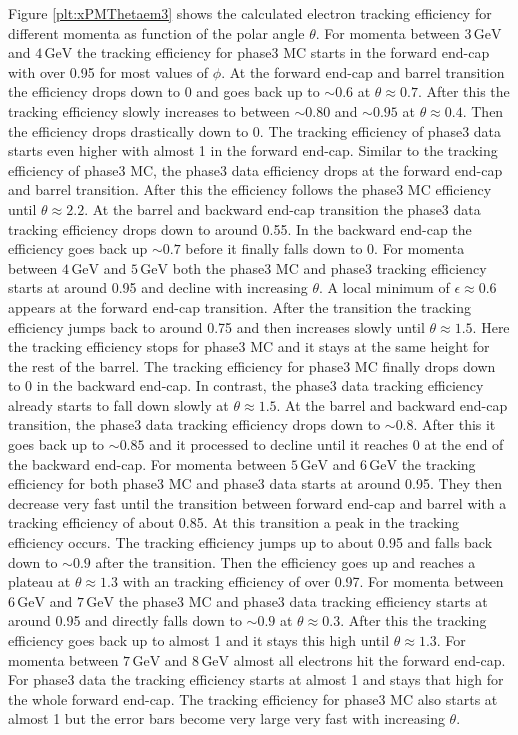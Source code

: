 \documentclass[a4paper,11pt,twosided,final,german,openbib,pdftex,listof=totoc,bibliography=totoc]{scrbook}
\begin{document}
Figure \ref{plt:xPMThetaem3} shows the calculated electron tracking efficiency for different momenta as function of the polar angle $\theta$.
For momenta between $3\,\textrm{GeV}$ and $4\,\textrm{GeV}$ the tracking efficiency for phase3 MC starts in the forward end-cap with over 0.95 for most values of $\phi$. At the forward end-cap and barrel transition the efficiency drops down to 0 and goes back up to $\sim 0.6$ at $\theta \approx 0.7$. After this the tracking efficiency slowly increases to between $\sim 0.80$ and $\sim 0.95$ at $\theta \approx 0.4$. Then the efficiency drops drastically down to 0. The tracking efficiency of phase3 data starts even higher with almost 1 in the forward end-cap. Similar to the tracking efficiency of phase3 MC, the phase3 data efficiency drops at the forward end-cap and barrel transition. After this the efficiency follows the phase3 MC efficiency until $\theta \approx 2.2$. At the barrel and backward end-cap transition the phase3 data tracking efficiency drops down to around 0.55. In the backward end-cap the efficiency goes back up $\sim 0.7$ before it finally falls down to 0.
For momenta between $4\,\textrm{GeV}$ and $5\,\textrm{GeV}$ both the phase3 MC and phase3 tracking efficiency starts at around 0.95 and decline with increasing $\theta$. A local minimum of $\epsilon \approx 0.6$ appears at the forward end-cap transition. After the transition the tracking efficiency jumps back to around 0.75 and then increases slowly until $\theta \approx 1.5$. Here the tracking efficiency stops for phase3 MC and it stays at the same height for the rest of the barrel. The tracking efficiency for phase3 MC finally drops down to 0 in the backward end-cap. In contrast, the phase3 data tracking efficiency already starts to fall down slowly at $\theta \approx 1.5$. At the barrel and backward end-cap transition, the phase3 data tracking efficiency drops down to $\sim 0.8$. After this it goes back up to $\sim 0.85$ and it processed to decline until it reaches 0 at the end of the backward end-cap.
For momenta between $5\,\textrm{GeV}$ and $6\,\textrm{GeV}$ the tracking efficiency for both phase3 MC and phase3 data starts at around 0.95. They then decrease very fast until the transition between forward end-cap and barrel with a tracking efficiency of about 0.85. At this transition a peak in the tracking efficiency occurs. The tracking efficiency jumps up to about 0.95 and falls back down to $\sim 0.9$ after the transition. Then the efficiency goes up and reaches a plateau at $\theta \approx 1.3$ with an tracking efficiency of over 0.97.
For momenta between $6\,\textrm{GeV}$ and $7\,\textrm{GeV}$ the phase3 MC and phase3 data tracking efficiency starts at around 0.95 and directly falls down to $\sim 0.9$ at $\theta \approx 0.3$. After this the tracking efficiency goes back up to almost 1 and it stays this high until $\theta \approx 1.3$.
For momenta between $7\,\textrm{GeV}$ and $8\,\textrm{GeV}$ almost all electrons hit the forward end-cap. For phase3 data the tracking efficiency starts at almost 1 and stays that high for the whole forward end-cap. The tracking efficiency for phase3 MC also starts at almost 1 but the error bars become very large very fast with increasing $\theta$.
\end{document}
